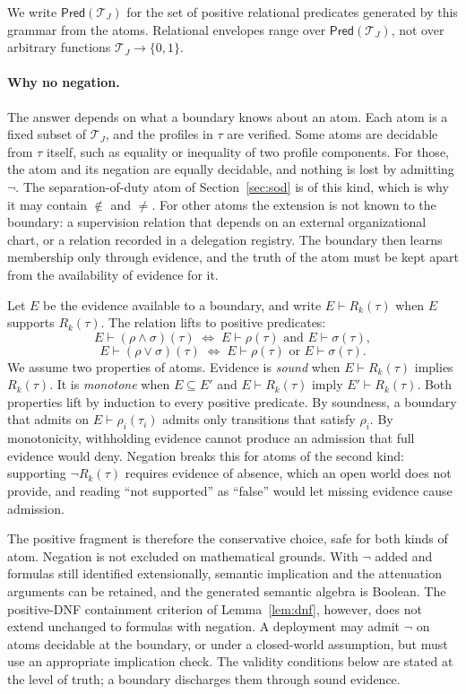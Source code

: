\documentclass[10pt,twocolumn]{article}
\newcommand{\Transitions}{\mathcal{T}}
\newcommand{\Pred}{\mathsf{Pred}}
\begin{document}
We write \(\Pred(\Transitions_J)\) for the set of positive relational
predicates generated by this grammar from the atoms. Relational envelopes range
over \(\Pred(\Transitions_J)\), not over arbitrary functions
\(\Transitions_J\rightarrow\{0,1\}\).

\paragraph{Why no negation.}\label{sec:relpred}
The answer depends on what a boundary knows about an atom. Each atom is a fixed
subset of \(\Transitions_J\), and the profiles in \(\tau\) are verified. Some
atoms are decidable from \(\tau\) itself, such as equality or inequality of two
profile components. For those, the atom and its negation are equally
decidable, and nothing is lost by admitting \(\lnot\). The separation-of-duty
atom of Section~\ref{sec:sod} is of this kind, which is why it may contain
\(\notin\) and \(\neq\). For other atoms the extension is not known to the
boundary: a supervision relation that depends on an external organizational
chart, or a relation recorded in a delegation registry. The boundary then
learns membership only through evidence, and the truth of the atom must be kept
apart from the availability of evidence for it.

Let \(E\) be the evidence available to a boundary, and write
\(E\vdash R_k(\tau)\) when \(E\) supports \(R_k(\tau)\). The relation lifts to
positive predicates:
\[
E\vdash(\rho\land\sigma)(\tau)
\;\Longleftrightarrow\;
E\vdash\rho(\tau)\text{ and }E\vdash\sigma(\tau),
\]
\[
E\vdash(\rho\lor\sigma)(\tau)
\;\Longleftrightarrow\;
E\vdash\rho(\tau)\text{ or }E\vdash\sigma(\tau).
\]
We assume two properties of atoms. Evidence is \emph{sound} when
\(E\vdash R_k(\tau)\) implies \(R_k(\tau)\). It is \emph{monotone} when
\(E\subseteq E'\) and \(E\vdash R_k(\tau)\) imply \(E'\vdash R_k(\tau)\). Both
properties lift by induction to every positive predicate. By soundness, a
boundary that admits on \(E\vdash\rho_i(\tau_i)\) admits only transitions that
satisfy \(\rho_i\). By monotonicity, withholding evidence cannot produce an
admission that full evidence would deny. Negation breaks this for atoms of the
second kind: supporting \(\lnot R_k(\tau)\) requires evidence of absence, which
an open world does not provide, and reading ``not supported'' as ``false''
would let missing evidence cause admission.

The positive fragment is therefore the conservative choice, safe for both kinds
of atom. Negation is not excluded on mathematical grounds. With \(\lnot\)
added and formulas still identified extensionally, semantic implication and
the attenuation arguments can be retained, and the generated semantic algebra
is Boolean. The positive-DNF containment criterion of
Lemma~\ref{lem:dnf}, however, does not extend unchanged to formulas with
negation. A deployment may admit \(\lnot\) on atoms decidable at the boundary,
or under a closed-world assumption, but must use an appropriate implication
check. The validity conditions below are stated at the level of truth; a
boundary discharges them through sound evidence.
\end{document}
